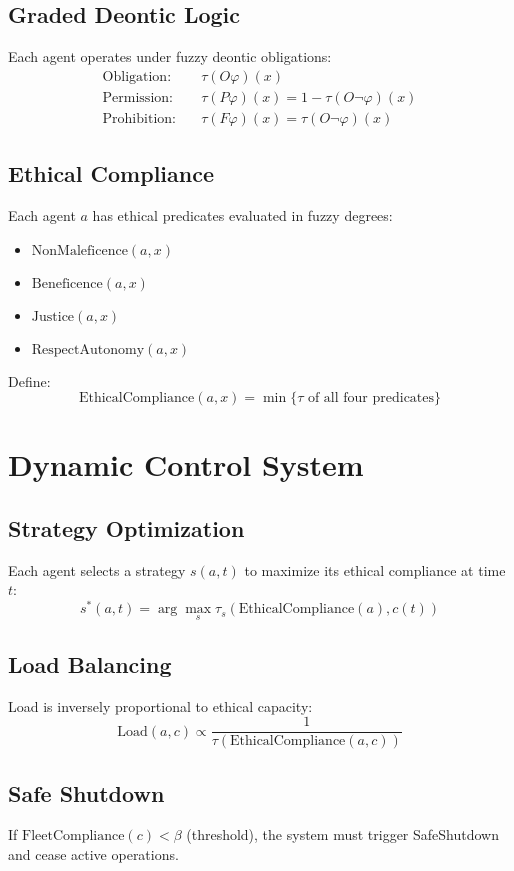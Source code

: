 \documentclass[11pt]{article}
\begin{document}
\subsection{Graded Deontic Logic}
Each agent operates under fuzzy deontic obligations:
\begin{align*}
\text{Obligation:} &\quad \tau(O\varphi)(x) \\
\text{Permission:} &\quad \tau(P\varphi)(x) = 1 - \tau(O\neg\varphi)(x) \\
\text{Prohibition:} &\quad \tau(F\varphi)(x) = \tau(O\neg\varphi)(x)
\end{align*}

\subsection{Ethical Compliance}
Each agent $a$ has ethical predicates evaluated in fuzzy degrees:
\begin{itemize}
  \item $\text{NonMaleficence}(a,x)$
  \item $\text{Beneficence}(a,x)$
  \item $\text{Justice}(a,x)$
  \item $\text{RespectAutonomy}(a,x)$
\end{itemize}

Define:
\[
\text{EthicalCompliance}(a,x) = \min \{ \tau \text{ of all four predicates} \}
\]

\section{Dynamic Control System}
\subsection{Strategy Optimization}
Each agent selects a strategy $s(a,t)$ to maximize its ethical compliance at time $t$:
\[
s^*(a,t) = \arg\max_s \tau_s(\text{EthicalCompliance}(a), c(t))
\]

\subsection{Load Balancing}
Load is inversely proportional to ethical capacity:
\[
\text{Load}(a, c) \propto \frac{1}{\tau(\text{EthicalCompliance}(a, c))}
\]

\subsection{Safe Shutdown}
If $\text{FleetCompliance}(c) < \beta$ (threshold), the system must trigger SafeShutdown and cease active operations.
\end{document}
